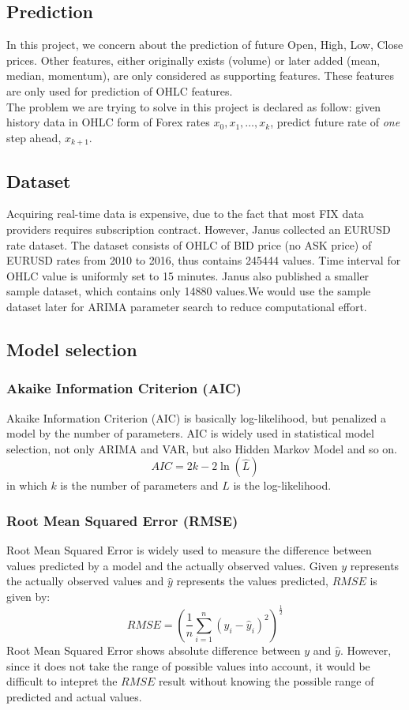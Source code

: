\documentclass[11pt]{article}
\begin{document}

\subsection{Prediction}
In this project, we concern about the prediction of future Open, High, Low,
Close prices. Other features, either originally exists (volume) or later added
(mean, median, momentum), are only considered as supporting features. These
features are only used for prediction of OHLC features.\\
The problem we are trying to solve in this project is declared as follow: given
history data in OHLC form of Forex rates $x_0, x_1,\ldots,x_k$, predict future
rate of \textit{one} step ahead, $x_{k+1}$.

\subsection{Dataset}
Acquiring real-time data is expensive, due to the fact that most FIX data
providers requires subscription contract. However, Janus \cite{meehau16eurusd}
collected an EURUSD rate dataset. The dataset consists of OHLC of BID price (no
ASK price) of EURUSD rates from 2010 to 2016, thus contains 245444 values. Time
interval for OHLC value is uniformly set to 15 minutes. Janus also published a
smaller sample dataset, which contains only 14880 values.We would use the sample
dataset later for ARIMA parameter search to reduce computational effort.

\subsection{Model selection}
\subsubsection{Akaike Information Criterion (AIC)}
Akaike Information Criterion (AIC) is basically log-likelihood, but penalized a
model by the number of parameters. AIC is widely used in statistical model
selection, not only ARIMA and VAR, but also Hidden Markov Model and so on.
$$
AIC = 2k -2\ln(\hat{L})
$$
in which $k$ is the number of parameters and $L$ is the log-likelihood.\\

\subsubsection{Root Mean Squared Error (RMSE)}
Root Mean Squared Error is widely used to measure the difference between values
predicted by a model and the actually observed values. Given $y$ represents the
actually observed values and $\hat{y}$ represents the values predicted, $RMSE$
is given by:
$$
RMSE = \left( \frac{1}{n}\sum _{i=1}^{n}(y_i -\hat{y}_i)^2 \right)^\frac{1}{2}
$$
Root Mean Squared Error shows absolute difference between $y$ and $\hat{y}$.
However, since it does not take the range of possible values into account, it
would be difficult to intepret the $RMSE$ result without knowing the possible
range of predicted and actual values. 
\end{document}

